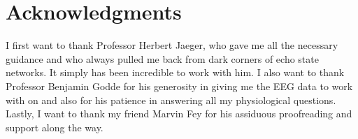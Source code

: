 \documentclass[a4paper,11pt,oneside]{article}
\begin{document}
\section{Acknowledgments}
I first want to thank Professor Herbert Jaeger, who gave me all the necessary guidance and who always pulled me back from dark corners of echo state networks. It simply has been incredible to work with him. I also want to thank Professor Benjamin Godde for his generosity in giving me the EEG data to work with on and also for his patience in answering all my physiological questions. Lastly, I want to thank my friend Marvin Fey for his assiduous proofreading and support along the way. 


\clearpage
\newpage





\end{document}

